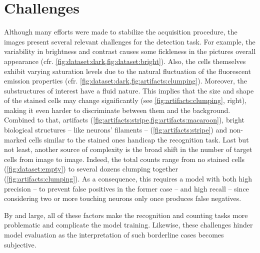 \section{Challenges}

Although many efforts were made to stabilize the acquisition procedure, the images present several relevant challenges for the detection task. 
For example, the variability in brightness and contrast causes some fickleness in the pictures overall appearance (cfr. \cref{fig:dataset:dark,fig:dataset:bright}).  
Also, the cells themselves exhibit varying saturation levels due to the natural fluctuation of the fluorescent emission properties (cfr. \cref{fig:dataset:dark,fig:artifacts:clumping}).
Moreover, the substructures of interest have a fluid nature. This implies that the size and shape of the stained cells may change significantly (see \cref{fig:artifacts:clumping}, right), making it even harder to discriminate between them and the background. 
Combined to that, artifacts (\cref{fig:artifacts:stripe,fig:artifacts:macaroon}), bright biological structures -- like neurons' filaments -- (\cref{fig:artifacts:stripe}) and non-marked cells similar to the stained ones handicap the recognition task. 
Last but not least, another source of complexity is the broad shift in the number of target cells from image to image.
Indeed, the total counts range from no stained cells (\cref{fig:dataset:empty}) to several dozens clumping together (\cref{fig:artifacts:clumping}). 
As a consequence, this requires a model with both high precision -- to prevent false positives in the former case -- and high recall -- since considering two or more touching neurons only once produces false negatives.


By and large, all of these factors make the recognition and counting tasks more problematic and complicate the model training.
Likewise, these challenges hinder model evaluation as the interpretation of such borderline cases becomes subjective.